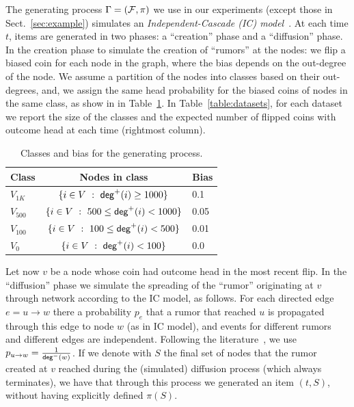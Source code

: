 The generating process $\Gamma=(\mathcal{F},\pi)$ we use in our experiments (except
those in Sect.~\ref{sec:example}) simulates an \emph{Independent-Cascade (IC)
model}~\citep{Kempe2003}. At each time $t$, items are generated in two phases:
a ``creation'' phase and a ``diffusion'' phase. In the creation phase to
simulate the creation of ``rumors'' at the nodes: we flip a biased coin
for each node in the graph, where the bias depends on the out-degree of the
node. We assume a partition of the nodes into classes based on their
out-degrees, and, we assign the same head probability for the biased coins of
nodes in the same class, as show in in Table~\ref{tab:bias}. In
Table~\ref{table:datasets}, for each dataset we report the size of the classes
and the expected number of flipped coins with outcome head at each time
(rightmost column).
\begin{table}[ht]
	\begin{tabular}{lcl}
		\toprule
		Class & Nodes in class & Bias\\
		\midrule
		$V_{1K}$ & $\{i\in V ~:~ \mathsf{deg}^+(i) \geq 1000\}$ & 0.1\\
		$V_{500}$ &  $\{i\in V ~:~ 500\leq \mathsf{deg}^+(i) < 1000\}$ & 0.05 \\
		$V_{100}$ & $\{i\in V ~:~ 100\leq \mathsf{deg}^+(i) < 500\}$  & 0.01 \\
		$V_{0}$   & $\{i\in V ~:~ \mathsf{deg}^+(i) < 100\}$ & 0.0\\
		\bottomrule
	\end{tabular}
	\caption{\scriptsize Classes and bias for the generating process.}
	\label{tab:bias}
\end{table}
Let now $v$ be a node whose coin had outcome head in the most recent flip. In
the ``diffusion'' phase we simulate the spreading of the ``rumor'' originating
at $v$ through network according to the IC model, as follows. For each directed
edge $e=u\rightarrow w$ there a probability $p_e$ that a rumor that reached $u$
is propagated through this edge to node $w$ (as in IC model), and events for
different rumors and different edges are independent. Following the
literature~\cite{Kempe2003,Chen2009,Chen2010,jung2011irie,tang2014influence}, we
use $p_{u\rightarrow w} = \frac{1}{\mathsf{deg}^-(w)}$. If we denote with $S$ the
final set of nodes that the rumor created at $v$ reached during the (simulated)
diffusion process (which always terminates), we have that through this process
we generated an item $(t,S)$, without having explicitly defined $\pi(S)$.
